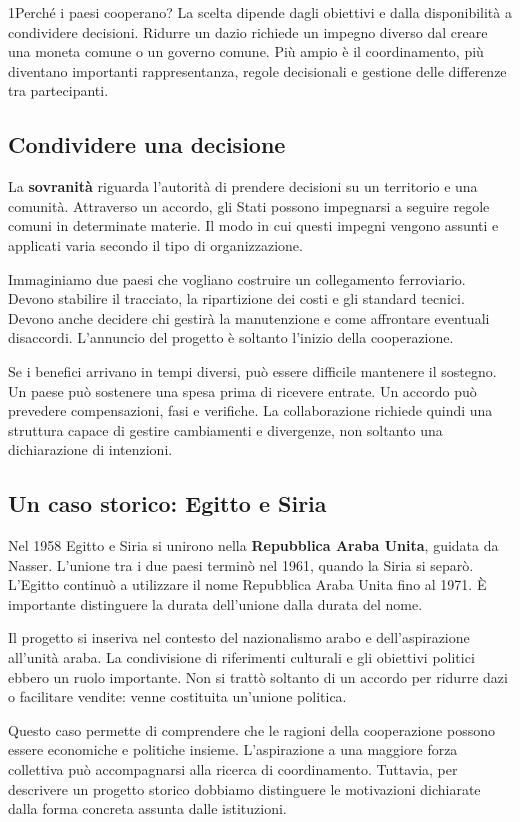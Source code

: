 \begin{lettura}{1}{Perché i paesi cooperano?}
La scelta dipende dagli obiettivi e dalla disponibilità a condividere decisioni. Ridurre un dazio richiede un impegno diverso dal creare una moneta comune o un governo comune. Più ampio è il coordinamento, più diventano importanti rappresentanza, regole decisionali e gestione delle differenze tra partecipanti.

\subsection*{Condividere una decisione}
La \textbf{sovranità} riguarda l'autorità di prendere decisioni su un territorio e una comunità. Attraverso un accordo, gli Stati possono impegnarsi a seguire regole comuni in determinate materie. Il modo in cui questi impegni vengono assunti e applicati varia secondo il tipo di organizzazione.

Immaginiamo due paesi che vogliano costruire un collegamento ferroviario. Devono stabilire il tracciato, la ripartizione dei costi e gli standard tecnici. Devono anche decidere chi gestirà la manutenzione e come affrontare eventuali disaccordi. L'annuncio del progetto è soltanto l'inizio della cooperazione.

Se i benefici arrivano in tempi diversi, può essere difficile mantenere il sostegno. Un paese può sostenere una spesa prima di ricevere entrate. Un accordo può prevedere compensazioni, fasi e verifiche. La collaborazione richiede quindi una struttura capace di gestire cambiamenti e divergenze, non soltanto una dichiarazione di intenzioni.

\subsection*{Un caso storico: Egitto e Siria}
Nel 1958 Egitto e Siria si unirono nella \textbf{Repubblica Araba Unita}, guidata da Nasser. L'unione tra i due paesi terminò nel 1961, quando la Siria si separò. L'Egitto continuò a utilizzare il nome Repubblica Araba Unita fino al 1971. È importante distinguere la durata dell'unione dalla durata del nome.

Il progetto si inseriva nel contesto del nazionalismo arabo e dell'aspirazione all'unità araba. La condivisione di riferimenti culturali e gli obiettivi politici ebbero un ruolo importante. Non si trattò soltanto di un accordo per ridurre dazi o facilitare vendite: venne costituita un'unione politica.

Questo caso permette di comprendere che le ragioni della cooperazione possono essere economiche e politiche insieme. L'aspirazione a una maggiore forza collettiva può accompagnarsi alla ricerca di coordinamento. Tuttavia, per descrivere un progetto storico dobbiamo distinguere le motivazioni dichiarate dalla forma concreta assunta dalle istituzioni.


\end{lettura}
